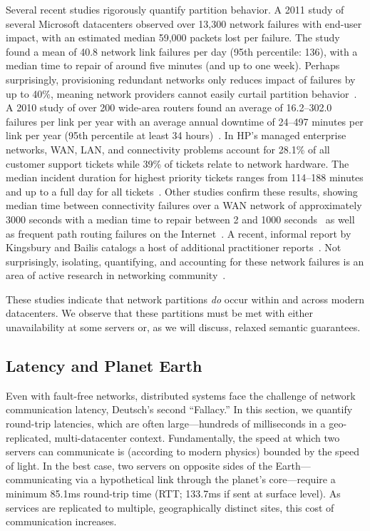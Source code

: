 Several recent studies rigorously quantify partition behavior. A 2011
study of several Microsoft datacenters observed over 13,300 network
failures with end-user impact, with an estimated median 59,000 packets
lost per failure. The study found a mean of 40.8 network link failures
per day (95th percentile: 136), with a median time to repair of around
five minutes (and up to one week). Perhaps surprisingly, provisioning
redundant networks only reduces impact of failures by up to 40\%,
meaning network providers cannot easily curtail partition
behavior~\cite{sigcomm-dc}. A 2010 study of over 200 wide-area routers
found an average of 16.2--302.0 failures per link per year with an
average annual downtime of 24--497 minutes per link per year (95th
percentile at least 34 hours)~\cite{sigcomm-wan}. In HP's managed
enterprise networks, WAN, LAN, and connectivity problems account for
28.1\% of all customer support tickets while 39\% of tickets relate to
network hardware.  The median incident duration for highest priority
tickets ranges from 114--188 minutes and up to a full day for all
tickets~\cite{turner2012failure}. Other studies confirm these results,
showing median time between connectivity failures over a WAN network
of approximately 3000 seconds with a median time to repair between 2
and 1000 seconds~\cite{ip-backbone-failures} as well as frequent path
routing failures on the Internet~\cite{labovitz-failures}. A recent,
informal report by Kingsbury and Bailis catalogs a host of additional
practitioner reports~\cite{aphyr-post}. Not surprisingly, isolating,
quantifying, and accounting for these network failures is an area of
active research in networking community~\cite{uw-failure-networks}.

These studies indicate that network partitions \textit{do} occur
within and across modern datacenters. We observe that these partitions
must be met with either unavailability at some servers or, as we will
discuss, relaxed semantic guarantees.

\subsection{Latency and Planet Earth}
\label{sec:latency}

Even with fault-free networks, distributed systems face the challenge
of network communication latency, Deutsch's second ``Fallacy.'' In
this section, we quantify round-trip latencies, which are often
large---hundreds of milliseconds in a geo-replicated, multi-datacenter
context.  Fundamentally, the speed at which two servers can
communicate is (according to modern physics) bounded by the speed of
light. In the best case, two servers on opposite sides of the
Earth---communicating via a hypothetical link through the planet's
core---require a minimum 85.1ms round-trip time (RTT; 133.7ms if sent
at surface level). As services are replicated to multiple,
geographically distinct sites, this cost of communication increases.


